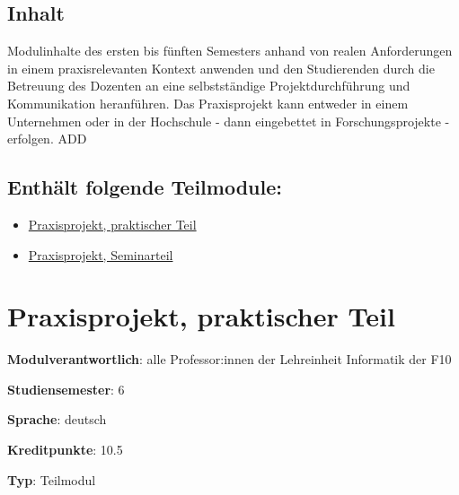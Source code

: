 \hypertarget{inhaltpathlabelmi-2017modulbeschreibungen-bachelorba_praxisprojekt}{%
\section*{Inhalt\label{/mi-2017/modulbeschreibungen-bachelor/BA_Praxisprojekt}}\label{inhaltpathlabelmi-2017modulbeschreibungen-bachelorba_praxisprojekt}}

Modulinhalte des ersten bis fünften Semesters anhand von realen
Anforderungen in einem praxisrelevanten Kontext anwenden und den
Studierenden durch die Betreuung des Dozenten an eine selbstständige
Projektdurchführung und Kommunikation heranführen. Das Praxisprojekt
kann entweder in einem Unternehmen oder in der Hochschule - dann
eingebettet in Forschungsprojekte - erfolgen. ADD

\hypertarget{enthuxe4lt-folgende-teilmodulepathlabelmi-2017modulbeschreibungen-bachelorba_praxisprojekt}{%
\section*{Enthält folgende
Teilmodule:\label{/mi-2017/modulbeschreibungen-bachelor/BA_Praxisprojekt}}\label{enthuxe4lt-folgende-teilmodulepathlabelmi-2017modulbeschreibungen-bachelorba_praxisprojekt}}

\begin{itemize}
\tightlist
\item
  \hyperref[/mi-2017/modulbeschreibungen-bachelor/BA_Praxisprojektarbeit]{Praxisprojekt, praktischer Teil}
\item
  \hyperref[/mi-2017/modulbeschreibungen-bachelor/BA_Praxisprojektseminar]{Praxisprojekt, Seminarteil}
\end{itemize}

\hypertarget{praxisprojekt-praktischer-teilpathlabelmi-2017modulbeschreibungen-bachelorba_praxisprojektarbeit}{%
\chapter{Praxisprojekt, praktischer
Teil\label{/mi-2017/modulbeschreibungen-bachelor/BA_Praxisprojektarbeit}}\label{praxisprojekt-praktischer-teilpathlabelmi-2017modulbeschreibungen-bachelorba_praxisprojektarbeit}}

\begin{modulHead}
\textbf{Modulverantwortlich}: alle Professor:innen
der Lehreinheit Informatik der
F10
\end{modulHead}
\begin{modulHead}
\textbf{Studiensemester}:
6
\end{modulHead}
\begin{modulHead}
\textbf{Sprache}:
deutsch
\end{modulHead}
\begin{modulHead}
\textbf{Kreditpunkte}:
10.5
\end{modulHead}
\begin{modulHead}
\textbf{Typ}:
Teilmodul
\end{modulHead}


